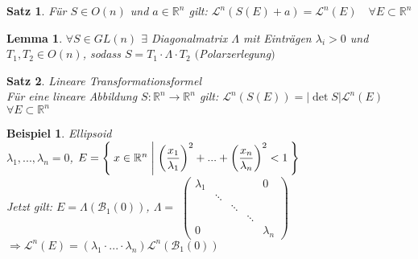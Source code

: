 \documentclass[11pt]{memoir}
\theoremstyle{changebreak}
\newtheorem{Beispiel}{Beispiel}[chapter]
\newtheorem{Lemma}{Lemma}[chapter]
\newtheorem{Satz}{Satz}[chapter]
\begin{document}
\begin{Satz}
Für $S \in O(n)$ und $a \in \mathbb R^n$ gilt:
$\mathscr L^n (S(E) +a) = \mathscr L^n(E)\quad \forall E \subset \mathbb R^n$
\end{Satz}


\begin{Lemma}
$\forall S \in GL(n)$ $\exists$ Diagonalmatrix $\Lambda$ mit Einträgen $\lambda_i > 0$ und $T_1, T_2 \in O(n)$, sodass $S = T_1\cdotp\Lambda\cdotp T_2$ $($Polarzerlegung$)$
\end{Lemma}


\begin{Satz}
\emph{Lineare Transformationsformel} \\
Für eine lineare Abbildung $S: \mathbb R^n \rightarrow \mathbb R^n$ gilt: $\mathscr L^n(S(E)) = |\det S| \mathscr L^n(E)$ $\forall E \subset \mathbb R^n$
\end{Satz}


\begin{Beispiel}
\emph{Ellipsoid} \\
$\lambda_1, ..., \lambda_n = 0$, $E = \Set{ x \in \mathbb R^n | \left( \dfrac{x_1}{\lambda_1} \right)^2 + ... + \left (\dfrac{x_n}{\lambda_n}\right)^2 < 1 }$ \\
Jetzt gilt: $E = \Lambda(\mathscr B_1(0))$, $\Lambda =$
$\begin{pmatrix}
      \lambda_1 & 	 &	&	& 0 \\
      		 &  	\ddots \\
		 &	& \ddots \\
		 &	&	& \ddots \\
		 0 &	&	&	&	\lambda_n
\end{pmatrix}$
$\Rightarrow \mathscr L^n(E) = (\lambda_1 \cdotp ... \cdotp \lambda_n)\mathscr L^n(\mathscr B_1(0))$
\end{Beispiel}
\end{document}
